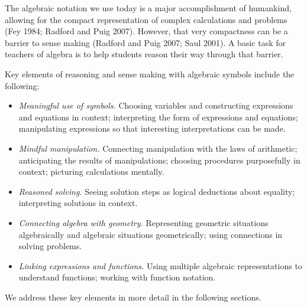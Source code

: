 \documentclass[
  10pt,
  a4paper,
  landscape,
  twoside,
  openany
]{scrbook}
\newcommand{\EN}[1]{#1}
\begin{document}
\TriPara
{
\EN{The algebraic notation we use today is a major accomplishment of humankind, allowing for the compact representation of complex calculations and problems (Fey 1984; Radford and Puig 2007). However, that very compactness can be a barrier to sense making (Radford and Puig 2007; Saul 2001). A basic task for teachers of algebra is to help students reason their way through that barrier.

Key elements of reasoning and sense making with algebraic symbols include the following:

\begin{itemize}
  \item \emph{Meaningful use of symbols.} Choosing variables and constructing expressions and equations in context; interpreting the form of expressions and equations; manipulating expressions so that interesting interpretations can be made.
  \item \emph{Mindful manipulation.} Connecting manipulation with the laws of arithmetic; anticipating the results of manipulations; choosing procedures purposefully in context; picturing calculations mentally.
  \item \emph{Reasoned solving.} Seeing solution steps as logical deductions about equality; interpreting solutions in context.
  \item \emph{Connecting algebra with geometry.} Representing geometric situations algebraically and algebraic situations geometrically; using connections in solving problems.
  \item \emph{Linking expressions and functions.} Using multiple algebraic representations to understand functions; working with function notation.
\end{itemize}

We address these key elements in more detail in the following sections.}
}
\end{document}
